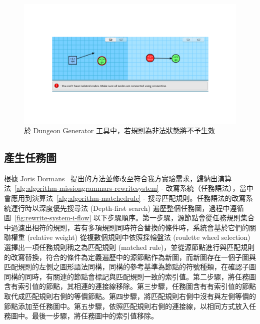 \begin{figure}[!htb]
  \begin{center}
    \includegraphics[width=1.0\textwidth]{figures/missiongrammars-illegal-rules.pdf}
    \caption{於 Dungeon Generator 工具中，若規則為非法狀態將不予生效}
    \label{fig:missiongrammars-illegal-rules}
  \end{center}
\end{figure}

\subsection{產生任務圖}
\label{ssec:method-missiongrammars-graph}

根據 Joris Dormans~\cite{dormans2010adventures} 提出的方法並修改至符合我方實驗需求，歸納出演算法~\ref{alg:algorithm-missiongrammars-rewritesystem} - 改寫系統（任務語法），當中會應用到演算法~\ref{alg:algorithm-matchedrule} - 搜尋匹配規則。任務語法的改寫系統運行時以深度優先搜尋法 (Depth-first search) 遍歷整個任務圖，過程中遵循圖~\ref{fig:rewrite-system-i-flow} 以下步驟順序。第一步驟，源節點會從任務規則集合中過濾出相符的規則，若有多項規則同時符合替換的條件時，系統會基於它們的關聯權重 (relative weight) 從複數個規則中依照採輪盤法 (roulette wheel selection)~\cite{lipowski2012roulette} 選擇出一項任務規則稱之為匹配規則 (matched rule)，並從源節點進行與匹配規則的改寫替換，符合的條件為定義遍歷中的源節點作為新圖，而新圖存在一個子圖與匹配規則的左側之圖形語法同構，同構的參考基準為節點的符號種類，在確認子圖同構的同時，有關連的節點會標記與匹配規則一致的索引值。第二步驟，將任務圖含有索引值的節點，其相連的連接線移除。第三步驟，任務圖含有有索引值的節點取代成匹配規則右側的等價節點。第四步驟，將匹配規則右側中沒有與左側等價的節點添加至任務圖中。第五步驟，依照匹配規則右側的連接線，以相同方式放入任務圖中。最後一步驟，將任務圖中的索引值移除。

